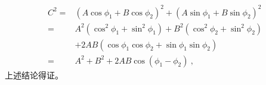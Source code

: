 \begin{equation}
\begin{aligned}
C^2
= & \left(A \cos \phi_1+B \cos \phi_2\right)^2+\left(A \sin \phi_1+B \sin \phi_2\right)^2 \\
= & A^2\left(\cos ^2 \phi_1+\sin ^2 \phi_1\right)+B^2\left(\cos ^2 \phi_2+\sin ^2 \phi_2\right) \\
& +2 A B\left(\cos \phi_1 \cos \phi_2+\sin \phi_1 \sin \phi_2\right) \\
= & A^2+B^2+2 A B \cos \left(\phi_1-\phi_2\right)~,
\end{aligned}
\end{equation}
上述结论得证。